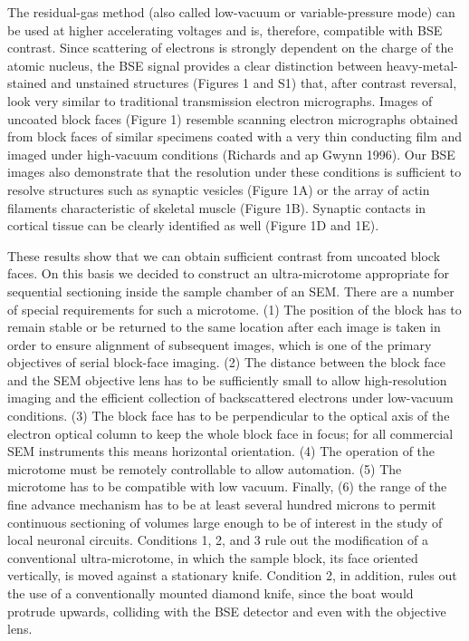 \documentclass{article}
\begin{document}
The residual-gas method (also called low-vacuum or variable-pressure mode) can be used at higher accelerating voltages and is, therefore, compatible with BSE contrast. Since scattering of electrons is strongly dependent on the charge of the atomic nucleus, the BSE signal provides a clear distinction between heavy-metal-stained and unstained structures (Figures 1 and S1) that, after contrast reversal, look very similar to traditional transmission electron micrographs. Images of uncoated block faces (Figure 1) resemble scanning electron micrographs obtained from block faces of similar specimens coated with a very thin conducting film and imaged under high-vacuum conditions (Richards and ap Gwynn 1996). Our BSE images also demonstrate that the resolution under these conditions is sufficient to resolve structures such as synaptic vesicles (Figure 1A) or the array of actin filaments characteristic of skeletal muscle (Figure 1B). Synaptic contacts in cortical tissue can be clearly identified as well (Figure 1D and 1E).

These results show that we can obtain sufficient contrast from uncoated block faces. On this basis we decided to construct an ultra-microtome appropriate for sequential sectioning inside the sample chamber of an SEM. There are a number of special requirements for such a microtome. (1) The position of the block has to remain stable or be returned to the same location after each image is taken in order to ensure alignment of subsequent images, which is one of the primary objectives of serial block-face imaging. (2) The distance between the block face and the SEM objective lens has to be sufficiently small to allow high-resolution imaging and the efficient collection of backscattered electrons under low-vacuum conditions. (3) The block face has to be perpendicular to the optical axis of the electron optical column to keep the whole block face in focus; for all commercial SEM instruments this means horizontal orientation. (4) The operation of the microtome must be remotely controllable to allow automation. (5) The microtome has to be compatible with low vacuum. Finally, (6) the range of the fine advance mechanism has to be at least several hundred microns to permit continuous sectioning of volumes large enough to be of interest in the study of local neuronal circuits. Conditions 1, 2, and 3 rule out the modification of a conventional ultra-microtome, in which the sample block, its face oriented vertically, is moved against a stationary knife. Condition 2, in addition, rules out the use of a conventionally mounted diamond knife, since the boat would protrude upwards, colliding with the BSE detector and even with the objective lens.
\end{document}
